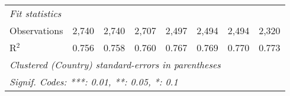 \begin{tabular}{lccccccc}
   \midrule \emph{Fit statistics}\\
   Observations                                                            & 2,740         & 2,740         & 2,707         & 2,497         & 2,494         & 2,494        & 2,320\\  
   R$^2$                                                                   & 0.756         & 0.758         & 0.760         & 0.767         & 0.769         & 0.770        & 0.773\\  
   \midrule
   \multicolumn{8}{l}{\emph{Clustered (Country) standard-errors in parentheses}}\\
   \multicolumn{8}{l}{\emph{Signif. Codes: ***: 0.01, **: 0.05, *: 0.1}}\\
\end{tabular}
\par\endgroup


